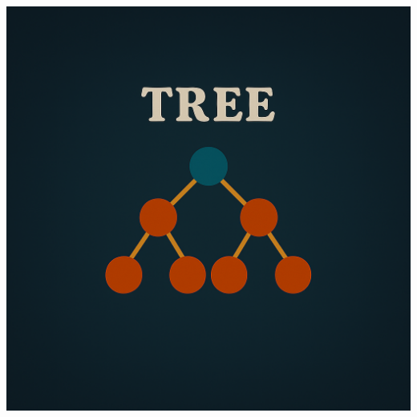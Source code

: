 \documentclass[a4paper,10pt]{book}
\begin{document}
\vspace{50mm}

\begin{center}
\includegraphics[height=13.88cm, width=17cm, keepaspectratio]{Pics/tree.png}
\end{center}
\end{document}
